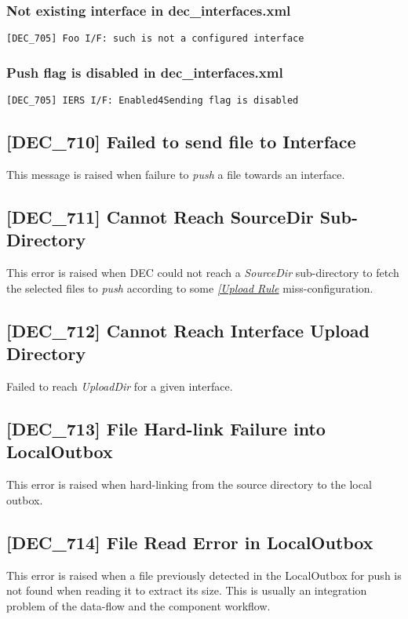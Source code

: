 \documentclass[dec_sum_main.tex]{subfiles}
\begin{document}
\subsubsection{Not existing interface in dec\_interfaces.xml }
\begin{verbatim}
[DEC_705] Foo I/F: such is not a configured interface
\end{verbatim}

\subsubsection{Push flag is disabled in dec\_interfaces.xml }
\begin{verbatim}
[DEC_705] IERS I/F: Enabled4Sending flag is disabled
\end{verbatim}

\label{DEC710}
\subsection{[DEC\_710] Failed to send file to Interface}
This message is raised when failure to \textit{push} a file towards an interface.

\label{DEC711}
\subsection{[DEC\_711] Cannot Reach SourceDir Sub-Directory}
This error is raised when DEC could not reach a \textit{SourceDir} sub-directory to fetch the selected files to \textit{push} according to some \hyperref[Upload Rules]{\textit{[Upload Rule}} miss-configuration.

\label{DEC712}
\subsection{[DEC\_712] Cannot Reach Interface Upload Directory}
Failed to reach \textit{UploadDir} for a given interface.

\label{DEC713}
\subsection{[DEC\_713] File Hard-link Failure into LocalOutbox}
This error is raised when hard-linking from the source directory to the local outbox.

\label{DEC714}
\subsection{[DEC\_714] File Read Error in LocalOutbox}
This error is raised when a file previously detected in the LocalOutbox for push is not found when reading it to extract its size. This is usually an integration problem of the data-flow and the component workflow.
\end{document}
